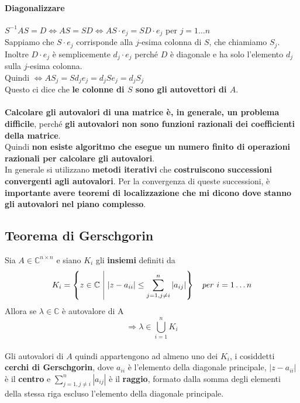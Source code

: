 \documentclass[10pt]{book}
\begin{document}
\paragraph{Diagonalizzare}
$S^{-1}AS = D \Leftrightarrow AS = SD \Leftrightarrow AS\cdot e_j = SD\cdot e_j$ per $j = 1 \ldots n$\\
Sappiamo che $S\cdot e_j$ corrisponde alla $j$-esima colonna di $S$, che chiamiamo $S_j$. Inoltre $D\cdot e_j$ è semplicemente $d_j\cdot e_j$ perché $D$ è diagonale e ha solo l'elemento $d_j$ sulla $j$-esima colonna.\\
Quindi $\Leftrightarrow AS_j = Sd_j e_j = d_j S e_j = d_j S_j$\\
Questo ci dice che \textbf{le colonne di $S$ sono gli autovettori di $A$}.\\\\
\textbf{Calcolare gli autovalori di una matrice è, in generale, un problema difficile}, perché \textbf{gli autovalori non sono funzioni razionali dei coefficienti della matrice}.\\
Quindi \textbf{non esiste algoritmo che esegue un numero finito di operazioni razionali per calcolare gli autovalori}.\\
In generale si utilizzano \textbf{metodi iterativi} che \textbf{costruiscono successioni convergenti agli autovalori}. Per la convergenza di queste successioni, è \textbf{importante avere teoremi di localizzazione che mi dicono dove stanno gli autovalori nel piano complesso}.
\subsection{Teorema di Gerschgorin}
Sia $A \in \mathbb{C}^{n \times n}$ e siano $K_i$ gli \textbf{insiemi} definiti da $$K_i = \left\{z \in \mathbb{C} \:\:\vline\:\: |z-a_{ii}| \leq \sum_{j = 1, j \neq i}^n |a_{ij}|\right\}\:\:\:\:\textit{per}\:\:i = 1 \ldots n$$ Allora se $\lambda \in \mathbb{C}$ è autovalore di A $$\Rightarrow \lambda \in \bigcup_{i = 1}^n K_i$$\\
Gli autovalori di $A$ quindi appartengono ad almeno uno dei $K_i$, i cosiddetti \textbf{cerchi di Gerschgorin}, dove $a_{ii}$ è l'elemento della diagonale principale, $|z - a_{ii}|$ è il \textbf{centro} e $\sum_{j = 1, j \neq i}^n |a_{ij}|$ è il \textbf{raggio}, formato dalla somma degli elementi della stessa riga escluso l'elemento della diagonale principale.
\end{document}

